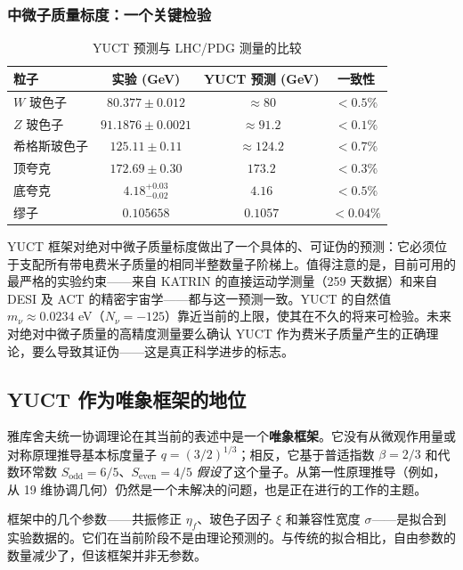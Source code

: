 \documentclass[11pt,a4paper]{article}
\begin{document}
	\subsubsection{中微子质量标度：一个关键检验}
	\begin{table}[h]
		\centering
		\caption{YUCT 预测与 LHC/PDG 测量的比较}
		\normalsize
		\label{tab:lhc_comparison}
		\begin{tabular}{l c c c}
			\toprule
			粒子 & 实验 (GeV) & YUCT 预测 (GeV) & 一致性 \\
			\midrule
			$W$ 玻色子  & $80.377 \pm 0.012$ & $\approx 80$ & $<0.5\%$ \\
			$Z$ 玻色子  & $91.1876 \pm 0.0021$ & $\approx 91.2$ & $<0.1\%$ \\
			希格斯玻色子 & $125.11 \pm 0.11$ & $\approx 124.2$ & $<0.7\%$ \\
			顶夸克  & $172.69 \pm 0.30$ & $173.2$ & $<0.3\%$ \\
			底夸克 & $4.18^{+0.03}_{-0.02}$ & $4.16$ & $<0.5\%$ \\
			缪子       & $0.105658$ & $0.1057$ & $<0.04\%$ \\
			\bottomrule
		\end{tabular}
	\end{table}
	
	YUCT 框架对绝对中微子质量标度做出了一个具体的、可证伪的预测：它必须位于支配所有带电费米子质量的相同半整数量子阶梯上。值得注意的是，目前可用的最严格的实验约束——来自 KATRIN 的直接运动学测量（259 天数据）和来自 DESI 及 ACT 的精密宇宙学——都与这一预测一致。YUCT 的自然值 $m_\nu \approx 0.0234$ eV（$N_\nu = -125$）靠近当前的上限，使其在不久的将来可检验。未来对绝对中微子质量的高精度测量要么确认 YUCT 作为费米子质量产生的正确理论，要么导致其证伪——这是真正科学进步的标志。
	
	\subsection*{YUCT 作为唯象框架的地位}
	
	雅库舍夫统一协调理论在其当前的表述中是一个\textbf{唯象框架}。它没有从微观作用量或对称原理推导基本标度量子 \(q = (3/2)^{1/3}\)；相反，它基于普适指数 \(\beta = 2/3\) 和代数环常数 \(S_{\mathrm{odd}}=6/5\)、\(S_{\mathrm{even}}=4/5\) \emph{假设}了这个量子。从第一性原理推导（例如，从 19 维协调几何）仍然是一个未解决的问题，也是正在进行的工作的主题。
	
	框架中的几个参数——共振修正 \(\eta_f\)、玻色子因子 \(\xi\) 和兼容性宽度 \(\sigma\)——是拟合到实验数据的。它们在当前阶段不是由理论预测的。与传统的拟合相比，自由参数的数量减少了，但该框架并非无参数。
	
\end{document}
